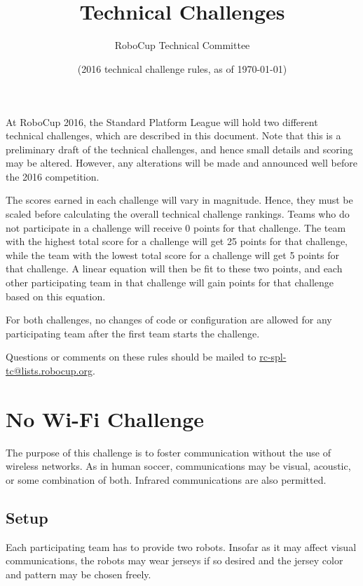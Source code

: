 \documentclass[12pt]{article}
\title{\leaguename \\ Technical Challenges}
\author{RoboCup Technical Committee}
\date{(2016 technical challenge rules, as of \today)}
\begin{document}
\maketitle

At RoboCup 2016, the Standard Platform League will hold two different technical challenges, which are described in this document.  Note that this is a preliminary draft of the technical challenges, and hence small details and scoring may be altered.  However, any alterations will be made and announced well before the 2016 competition.

The scores earned in each challenge will vary in magnitude.  Hence, they must be scaled before calculating the overall technical challenge rankings.  Teams who do not participate in a challenge will receive 0 points for that challenge.  The team with the highest total score for a challenge will get 25 points for that challenge, while the team with the lowest total score for a challenge will get 5 points for that challenge.  A linear equation will then be fit to these two points, and each other participating team in that challenge will gain points for that challenge based on this equation.

For both challenges, no changes of code or configuration are allowed for any participating team after the first team starts the challenge. 

Questions or comments on these rules should be mailed to {\small \url{rc-spl-tc@lists.robocup.org}}.

\vfill

\renewcommand\contentsname{Challenges}
\tableofcontents
\setcounter{tocdepth}{1}

\thispagestyle{fancy}

\clearpage

\cfoot{\thepage}
\setcounter{page}{1}

\newcommand{\openMinNum}{three}




\section{No Wi-Fi Challenge}

The purpose of this challenge is to foster communication without the use of wireless networks.
As in human soccer, communications may be visual, acoustic, or some combination of both.
Infrared communications are also permitted.

\subsection{Setup}
Each participating team has to provide two robots. Insofar as it may affect visual communications,
the robots may wear jerseys if so desired and the
jersey color and pattern may be chosen freely. 
\end{document}
